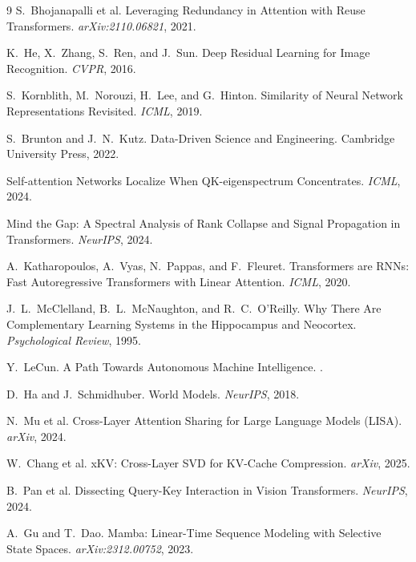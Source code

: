 \documentclass[11pt, a4paper]{article}
\theoremstyle{remark}
\begin{document}
\begin{thebibliography}{9}
S.~Bhojanapalli et al.
\newblock Leveraging Redundancy in Attention with Reuse Transformers.
\newblock \emph{arXiv:2110.06821}, 2021.

K.~He, X.~Zhang, S.~Ren, and J.~Sun.
\newblock Deep Residual Learning for Image Recognition.
\newblock \emph{CVPR}, 2016.

S.~Kornblith, M.~Norouzi, H.~Lee, and G.~Hinton.
\newblock Similarity of Neural Network Representations Revisited.
\newblock \emph{ICML}, 2019.

S.~Brunton and J.~N.~Kutz.
\newblock Data-Driven Science and Engineering.
\newblock Cambridge University Press, 2022.

Self-attention Networks Localize When QK-eigenspectrum Concentrates.
\newblock \emph{ICML}, 2024.

Mind the Gap: A Spectral Analysis of Rank Collapse and Signal Propagation in Transformers.
\newblock \emph{NeurIPS}, 2024.

A.~Katharopoulos, A.~Vyas, N.~Pappas, and F.~Fleuret.
\newblock Transformers are RNNs: Fast Autoregressive Transformers with Linear Attention.
\newblock \emph{ICML}, 2020.

J.~L.~McClelland, B.~L.~McNaughton, and R.~C.~O'Reilly.
\newblock Why There Are Complementary Learning Systems in the Hippocampus and Neocortex.
\newblock \emph{Psychological Review}, 1995.


Y.~LeCun.
\newblock A Path Towards Autonomous Machine Intelligence.
.

D.~Ha and J.~Schmidhuber.
\newblock World Models.
\newblock \emph{NeurIPS}, 2018.

N.~Mu et al.
\newblock Cross-Layer Attention Sharing for Large Language Models (LISA).
\newblock \emph{arXiv}, 2024.

W.~Chang et al.
\newblock xKV: Cross-Layer SVD for KV-Cache Compression.
\newblock \emph{arXiv}, 2025.

B.~Pan et al.
\newblock Dissecting Query-Key Interaction in Vision Transformers.
\newblock \emph{NeurIPS}, 2024.

A.~Gu and T.~Dao.
\newblock Mamba: Linear-Time Sequence Modeling with Selective State Spaces.
\newblock \emph{arXiv:2312.00752}, 2023.


\end{thebibliography}
\end{document}
